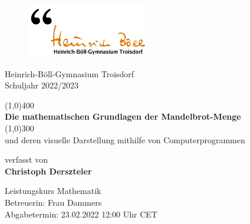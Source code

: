 \begin{titlepage}
  \begin{center}
    \begin{figure}
      \vspace{-2cm}
      \hspace{-2cm}
      \includegraphics[scale=0.75]{images/heinrichboellgymnasium}
    \end{figure}

    \vspace{1cm}
    Heinrich-Böll-Gymnasium Troisdorf\\
    Schuljahr 2022/2023

    \vspace{1cm}
    \Huge
    \line(1,0){400}\\
    \textbf{Die mathematischen Grundlagen der Mandelbrot-Menge}\\
    \line(1,0){300}\\

    \vspace{0.75cm}
    \Large
    und deren visuelle Darstellung mithilfe von Computerprogrammen

    \vspace{2cm}
    \large
    verfasst von\\
    \Large
    \textbf{Christoph Derszteler}

    \vfill
    \large
    Leistungskurs Mathematik\\
    Betreuerin: Frau Dammers\\
    Abgabetermin: 23.02.2022 12:00 Uhr CET\\
  \end{center}
\end{titlepage}